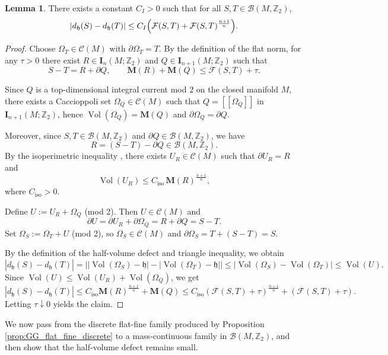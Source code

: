 \documentclass[12pt,english]{article}
\theoremstyle{definition}
\newtheorem{lemma}[theorem]{Lemma}
\begin{document}
\begin{lemma}\label{lem:dhv_control_by_flat}
There exists a constant $C_I>0$ such that for all $S,T\in \mathcal B(M,\mathbb{Z}_2)$,
\[
|d_{\mathfrak h}(S)-d_{\mathfrak h}(T)|
\le C_I\Bigl(\mathcal F(S,T)+\mathcal F(S,T)^{\frac{n+1}{n}}\Bigr).
\]
\end{lemma}

\begin{proof}
Choose $\Omega_T\in \mathcal C(M)$ with $\partial\Omega_T=T$.
By the definition of the flat norm, for any $\tau>0$ there exist
$R\in \mathbf I_n(M;\mathbb{Z}_2)$ and $Q\in \mathbf I_{n+1}(M;\mathbb{Z}_2)$ such that
\[
S-T = R+\partial Q,
\qquad
\mathbf M(R)+\mathbf M(Q)\le \mathcal F(S,T)+\tau.
\]

Since $Q$ is a top-dimensional integral current mod $2$ on the closed manifold $M$,
there exists a Caccioppoli set $\Omega_Q\in \mathcal C(M)$ such that
$Q=[\![\Omega_Q]\!]$ in $\mathbf I_{n+1}(M;\mathbb{Z}_2)$, hence $\operatorname{Vol}(\Omega_Q)=\mathbf M(Q)$ and $\partial\Omega_Q=\partial Q$.

Moreover, since $S,T\in \mathcal B(M,\mathbb{Z}_2)$ and $\partial Q\in \mathcal B(M,\mathbb{Z}_2)$, we have
\[
R=(S-T)-\partial Q\in \mathcal B(M,\mathbb{Z}_2).
\]
By the isoperimetric inequality \cite{Isoperimetric1, Isoperimetric2, Isoperimetric3}, there exists $U_R\in \mathcal C(M)$ such that $\partial U_R = R$ and
\[
\operatorname{Vol}(U_R)\le C_{\mathrm{iso}}\,\mathbf M(R)^{\frac{n+1}{n}},
\]
where $C_{\mathrm{iso}}>0$.

Define $U:=U_R+\Omega_Q$ (mod 2). Then $U\in\mathcal C(M)$ and
\[
\partial U=\partial U_R+\partial\Omega_Q = R+\partial Q = S-T.
\]
Set $
\Omega_S:=\Omega_T+U$ (mod 2),
so $\Omega_S\in\mathcal C(M)$ and $\partial\Omega_S=T+(S-T)=S$.

By the definition of the half-volume defect and triangle inequality, we obtain
\[
|d_{\mathfrak h}(S)-d_{\mathfrak h}(T)|
= \bigl||\operatorname{Vol}(\Omega_S)-\mathfrak h|-|\operatorname{Vol}(\Omega_T)-\mathfrak h|\bigr|
\le |\operatorname{Vol}(\Omega_S)-\operatorname{Vol}(\Omega_T)|
\le \operatorname{Vol}(U).
\]
Since $\operatorname{Vol}(U)\le \operatorname{Vol}(U_R)+\operatorname{Vol}(\Omega_Q)$, we get
\[
|d_{\mathfrak h}(S)-d_{\mathfrak h}(T)|
\le C_{\mathrm{iso}}\mathbf M(R)^{\frac{n+1}{n}}+\mathbf M(Q)
\le C_{\mathrm{iso}}(\mathcal F(S,T)+\tau)^{\frac{n+1}{n}}+(\mathcal F(S,T)+\tau).
\]
Letting $\tau\downarrow 0$ yields the claim.
\end{proof}

We now pass from the discrete flat-fine family produced by Proposition
\ref{prop:GG_flat_fine_discrete} to a mass-continuous family in $\mathcal B(M,\mathbb{Z}_2)$, and then
show that the half-volume defect remains small.
\end{document}
